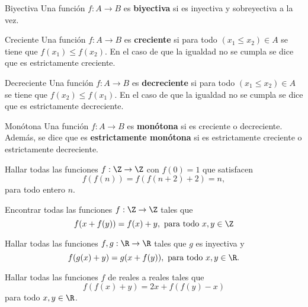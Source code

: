 \documentclass[12pt]{article}
\begin{document}
   \begin{definition.box}{Biyectiva}{}
      Una función $f : A \to B$ es \textbf{biyectiva} si es inyectiva y sobreyectiva a la vez.
   \end{definition.box}

   \begin{definition.box}{Creciente}{}
      Una función $f : A \to B$ es \textbf{creciente} si para todo $(x_1 \leq x_2) \in A$ se tiene que $f(x_1) \leq f(x_2)$.
      En el caso de que la igualdad no se cumpla se dice que es estrictamente creciente.
   \end{definition.box}

   \begin{definition.box}{Decreciente}{}
      Una función $f : A \to B$ es \textbf{decreciente} si para todo $(x_1 \leq x_2) \in A$ se tiene que $f(x_2) \leq f(x_1)$.
      En el caso de que la igualdad no se cumpla se dice que es estrictamente decreciente.
   \end{definition.box}

   \begin{definition.box}{Monótona}{}
      Una función $f : A \to B$ es \textbf{monótona} si es creciente o decreciente.
      Además, se dice que es \textbf{estrictamente monótona} si es estrictamente creciente o estrictamente decreciente.
   \end{definition.box}

   \begin{exercise}
      Hallar todas las funciones $f : \Z \to \Z$ con $f(0) = 1$ que satisfacen
      \[
         f(f(n)) = f(f(n + 2) + 2) = n,
      \]
      para todo entero $n$.
   \end{exercise}

   \begin{exercise}
      Encontrar todas las funciones $f : \Z \to \Z$ tales que
      \[
         f(x + f(y)) = f(x) + y,\ \text{para todo}\ x,y \in \Z
      \]
   \end{exercise}

   \begin{exercise}
      Hallar todas las funciones $f,g : \R \to \R$ tales que $g$ es inyectiva y
      \[
         f(g(x) + y) = g(x + f(y)),\ \text{para todo}\ x,y \in \R.
      \]
   \end{exercise}

   \begin{exercise}
      Hallar todas las funciones $f$ de reales a reales tales que
      \[
         f(f(x) + y) = 2x + f(f(y) - x)
      \]
      para todo $x,y \in \R$.
   \end{exercise}
\end{document}
